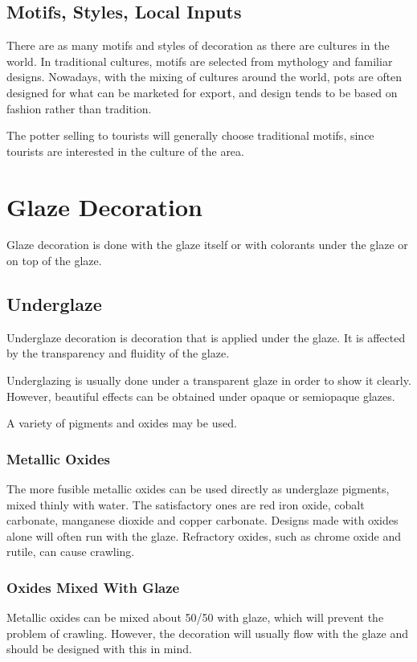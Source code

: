 \subsection{Motifs, Styles, Local Inputs}
There are as many motifs and styles of decoration as there are cultures in the 
world. In traditional cultures, motifs are selected from mythology and familiar 
designs. Nowadays, with the mixing of cultures around the world, pots are often 
designed for what can be marketed for export, and design tends to be based on 
fashion rather than tradition.

The potter selling to tourists will generally choose traditional motifs, since 
tourists are interested in the culture of the area.
\section{Glaze Decoration}
Glaze decoration is done with the glaze itself or with colorants under the 
glaze or on top of the glaze.
\subsection{Underglaze}
Underglaze decoration is decoration that is applied under the glaze. It is 
affected by the transparency and fluidity of the glaze.

Underglazing is usually done under a transparent glaze in order to show it 
clearly. However, beautiful effects can be obtained under opaque or semiopaque 
glazes.

A variety of pigments and oxides may be used.
\subsubsection{Metallic Oxides}
The more fusible metallic oxides can be used directly as underglaze pigments, 
mixed thinly with water. The satisfactory ones are red iron oxide, cobalt 
carbonate, manganese dioxide and copper carbonate. Designs made with oxides 
alone will often run with the glaze. Refractory oxides, such as chrome oxide 
and rutile, can cause crawling.
\subsubsection{Oxides Mixed With Glaze}
Metallic oxides can be mixed about 50/50 with glaze, which will prevent the 
problem of crawling. However, the decoration will usually flow with the glaze 
and should be designed with this in mind.
